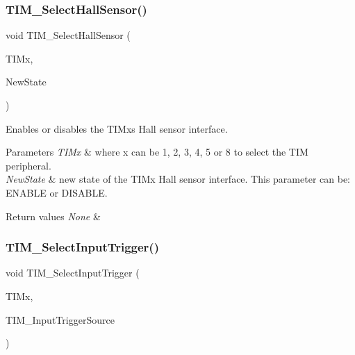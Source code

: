 \subsubsection{\texorpdfstring{TIM\_SelectHallSensor()}{TIM\_SelectHallSensor()}}
{\footnotesize\ttfamily void T\+I\+M\+\_\+\+Select\+Hall\+Sensor (\begin{DoxyParamCaption}\item[{\mbox{\hyperlink{struct_t_i_m___type_def}{T\+I\+M\+\_\+\+Type\+Def}} $\ast$}]{T\+I\+Mx,  }\item[{\mbox{\hyperlink{group___exported__types_gac9a7e9a35d2513ec15c3b537aaa4fba1}{Functional\+State}}}]{New\+State }\end{DoxyParamCaption})}



Enables or disables the T\+I\+Mx\textquotesingle{}s Hall sensor interface. 


\begin{DoxyParams}{Parameters}
{\em T\+I\+Mx} & where x can be 1, 2, 3, 4, 5 or 8 to select the T\+IM peripheral. \\
\hline
{\em New\+State} & new state of the T\+I\+Mx Hall sensor interface. This parameter can be\+: E\+N\+A\+B\+LE or D\+I\+S\+A\+B\+LE. \\
\hline
\end{DoxyParams}

\begin{DoxyRetVals}{Return values}
{\em None} & \\
\hline
\end{DoxyRetVals}
\mbox{\label{group___t_i_m___exported___functions_ga4252583c6ae8a73d6fc66f7e951dbc35}} 
\subsubsection{\texorpdfstring{TIM\_SelectInputTrigger()}{TIM\_SelectInputTrigger()}}
{\footnotesize\ttfamily void T\+I\+M\+\_\+\+Select\+Input\+Trigger (\begin{DoxyParamCaption}\item[{\mbox{\hyperlink{struct_t_i_m___type_def}{T\+I\+M\+\_\+\+Type\+Def}} $\ast$}]{T\+I\+Mx,  }\item[{uint16\+\_\+t}]{T\+I\+M\+\_\+\+Input\+Trigger\+Source }\end{DoxyParamCaption})}



